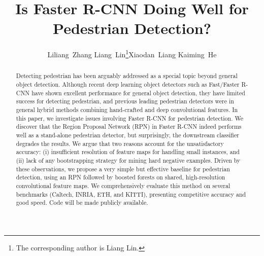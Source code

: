 \documentclass[runningheads]{llncs}
\begin{document}
\pagestyle{headings}
\mainmatter

\title{Is Faster R-CNN Doing Well for \\ Pedestrian Detection?} 

\titlerunning{~}

\authorrunning{~}







\author{Liliang~Zhang  \quad Liang~Lin\thanks{The corresponding author is Liang Lin.}\quad Xiaodan~Liang  \quad Kaiming~He}




\maketitle

\begin{abstract}
Detecting pedestrian has been arguably addressed as a special topic beyond general object detection. Although recent deep learning object detectors such as Fast/Faster R-CNN \cite{girshickICCV15fastrcnn,ren2015faster} have shown excellent performance for general object detection, they have limited success for detecting pedestrian, and previous leading pedestrian detectors were in general hybrid methods combining hand-crafted and deep convolutional features. In this paper, we investigate issues involving Faster R-CNN \cite{ren2015faster} for pedestrian detection. We discover that the Region Proposal Network (RPN) in Faster R-CNN indeed performs well as a stand-alone pedestrian detector, but surprisingly, the downstream classifier degrades the results. We argue that two reasons account for the unsatisfactory accuracy: (i) insufficient resolution of feature maps for handling small instances, and (ii) lack of any bootstrapping strategy for mining hard negative examples. Driven by these observations, we propose a very simple but effective baseline for pedestrian detection, using an RPN followed by boosted forests on shared, high-resolution convolutional feature maps. We comprehensively evaluate this method on several benchmarks (Caltech, INRIA, ETH, and KITTI), presenting competitive accuracy and good speed. Code will be made publicly available.

\end{abstract}
\end{document}
